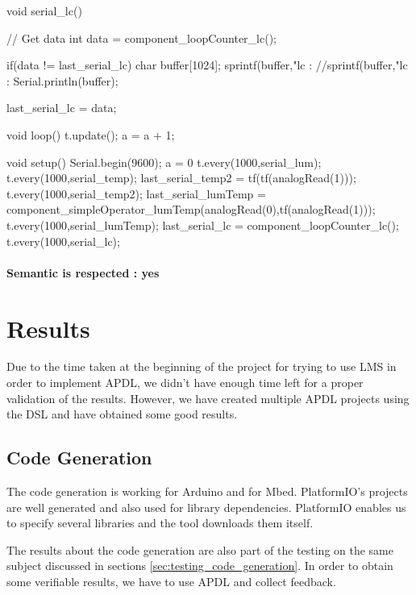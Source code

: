 \begin{arduinocode}
void serial_lc() {
    // Get data
    int data = component_loopCounter_lc();

    if(data != last_serial_lc) {
        char buffer[1024];
        sprintf(buffer,"lc : %
        //sprintf(buffer,"lc : %
        Serial.println(buffer);
    }

    last_serial_lc = data;
}

void loop() {
    t.update();
    a = a + 1;
}

void setup() {
    Serial.begin(9600);
    a = 0
        t.every(1000,serial_lum);
    t.every(1000,serial_temp);
    last_serial_temp2 = tf(tf(analogRead(1)));
    t.every(1000,serial_temp2);
    last_serial_lumTemp = component_simpleOperator_lumTemp(analogRead(0),tf(analogRead(1)));
    t.every(1000,serial_lumTemp);
    last_serial_lc = component_loopCounter_lc();
    t.every(1000,serial_lc);
}
\end{arduinocode}

\paragraph*{Semantic is respected : yes}
\newpage

\section{Results}
\label{sec:results}

Due to the time taken at the beginning of the project for trying to use
\gls{LMS} in order to implement \gls{APDL}, we didn't have enough time left
for a proper validation of the results. However, we have created multiple
\gls{APDL} projects using the \gls{DSL} and have obtained some good results.

\subsection{Code Generation}
\label{sec:res_code_generation}

The code generation is working for Arduino and for Mbed. PlatformIO's projects
are well generated and also used for library dependencies. PlatformIO enables us
to specify several libraries and the tool downloads them itself.

The results about the code generation are also part of the testing on the same
subject discussed in sections \ref{sec:testing_code_generation}. In order to
obtain some verifiable results, we have to use \gls{APDL} and collect feedback.

